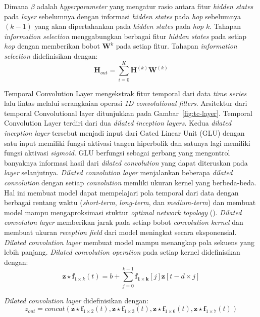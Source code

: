 Dimana $\beta$ adalah \textit{hyperparameter} yang mengatur rasio antara fitur \textit{hidden states} pada \textit{layer} sebelumnya dengan informasi \textit{hidden states} pada \textit{hop} sebelumnya $(k-1)$ yang akan dipertahankan pada \textit{hidden states} pada \textit{hop} $k$. Tahapan \textit{information selection} menggabungkan berbagai fitur \textit{hidden states} pada setiap \textit{hop} dengan memberikan bobot $\mathbf{W}^{k}$ pada setiap fitur. Tahapan \textit{information selection} didefinisikan dengan:
\begin{equation}
    \mathbf{H}_{out} = \sum_{i=0}^{K}\mathbf{H}^{(k)}\mathbf{W}^{(k)}
\end{equation}

Temporal Convolution Layer mengekstrak fitur temporal dari data \textit{time series} lalu lintas melalui serangkaian operasi \textit{1D convolutional filters}. Arsitektur dari temporal Convolutional layer ditunjukkan pada Gambar~\ref{fig:tc-layer}. Temporal Convolution Layer terdiri dari dua \textit{dilated inception layers}. Kedua \textit{dilated inception layer} tersebut menjadi input dari Gated Linear Unit (GLU) dengan satu input memiliki fungsi aktivasi tangen hiperbolik dan satunya lagi memiliki fungsi aktivasi \textit{sigmoid}. GLU berfungsi sebagai gerbang yang mengontrol banyaknya informasi hasil dari \textit{dilated convolution} yang dapat diteruskan pada \textit{layer} selanjutnya. \textit{Dilated convolution layer} menjalankan beberapa \textit{dilated convolution} dengan setiap \textit{convolution} memliki ukuran kernel yang berbeda-beda. Hal ini membuat model dapat mempelajari pola temporal dari data dengan berbagai rentang waktu (\textit{short-term}, \textit{long-term}, dan \textit{medium-term}) dan membuat model mampu mengaproksimasi stuktur \textit{optimal network topology} (\cite{Wu2020}). \textit{Dilated convoluton layer} memberikan jarak pada setiap bobot \textit{convolution kernel} dan membuat ukuran \textit{reception field } dari model meningkat secara eksponensial. \textit{Dilated convolution layer} membuat model mampu menangkap pola sekuens yang lebih panjang. \textit{Dilated convolution operation} pada setiap kernel didefinisikan dengan:
\begin{equation}
    \mathbf{z} \star \mathbf{f}_{1\times k}(t)  =b+\sum_{j=0}^{k-1}  \mathbf{f_{1\times k}}[j] \mathbf{z}[t-d\times j]
\end{equation}

\textit{Dilated convolution layer} didefinisikan dengan:
\begin{equation}
    z_{out}= concat(\mathbf{z} \star \mathbf{f}_{1\times 2}(t), \mathbf{z} \star \mathbf{f}_{1\times 3}(t), \mathbf{z} \star \mathbf{f}_{1\times 6}(t), \mathbf{z} \star \mathbf{f}_{1\times 7}(t))
\end{equation}

